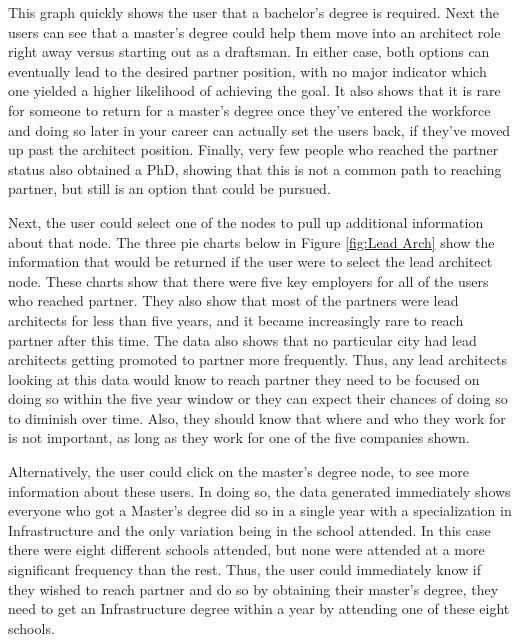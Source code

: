This graph quickly shows the user that a bachelor's degree is required.  Next
the users can see that a master's degree could help them move into an architect
role right away versus starting out as a draftsman.  In either case, both
options can eventually lead to the desired partner position, with no major
indicator which one yielded a higher likelihood of achieving the goal.  It also
shows that it is rare for someone to return for a master's degree once they've
entered the workforce and doing so later in your career can actually set the
users back, if they've moved up past the architect position.  Finally, very
few people who reached the partner status also obtained a PhD, showing that this
is not a common path to reaching partner, but still is an option that could be
pursued.

Next, the user could select one of the nodes to pull up additional information
about that node.  The three pie charts below in Figure \ref{fig:Lead Arch} show
the information that would be returned if the user were to select the lead
architect node.  These charts show that there were five key employers for all of
the users who reached partner.  They also show that most of the partners were
lead architects for less than five years, and it became increasingly rare to
reach partner after this time.  The data also shows that no particular city had
lead architects getting promoted to partner more frequently.  Thus, any lead
architects looking at this data would know to reach partner they need to be
focused on doing so within the five year window or they can expect their chances
of doing so to diminish over time.  Also, they should know that where and who
they work for is not important, as long as they work for one of the five
companies shown.

Alternatively, the user could click on the master's degree node, to see more
information about these users.  In doing so, the data generated immediately
shows everyone who got a Master's degree did so in a single year with a
specialization in Infrastructure and the only variation being in the school
attended.  In this case there were eight different schools attended, but none
were attended at a more significant frequency than the rest.  Thus, the user
could immediately know if they wished to reach partner and do so by obtaining their
master's degree, they need to get an Infrastructure degree within a year by
attending one of these eight schools.


